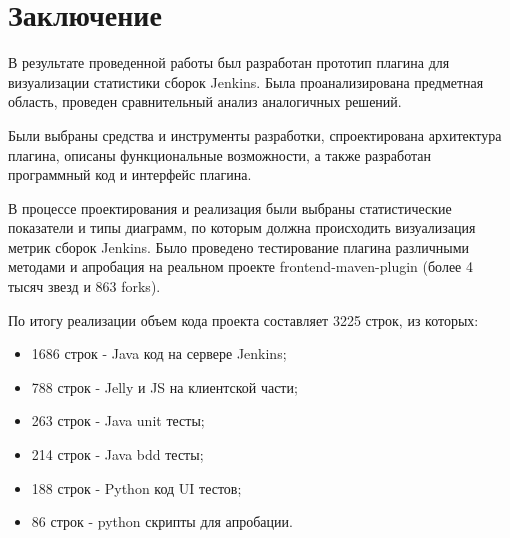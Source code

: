 \chapter*{Заключение} \label{ch-conclusion}

В результате проведенной работы был разработан прототип плагина для визуализации статистики сборок Jenkins. Была проанализирована предметная область, проведен сравнительный анализ аналогичных решений.

Были выбраны средства и инструменты разработки, спроектирована архитектура плагина, описаны функциональные возможности, а также разработан программный код и интерфейс плагина.

В процессе проектирования и реализация были выбраны статистические показатели и типы диаграмм, по которым должна происходить визуализация метрик сборок Jenkins. Было проведено тестирование плагина различными методами и апробация на реальном проекте frontend-maven-plugin (более 4 тысяч звезд и 863 forks).

По итогу реализации объем кода проекта составляет 3225 строк, из которых:

\begin{itemize}
	\item 1686 строк  - Java код на сервере Jenkins;
	\item 788 строк - Jelly и JS на клиентской части;
	\item 263 строк - Java unit тесты;
	\item 214 строк - Java bdd тесты;
	\item 188 строк - Python код UI тестов;
	\item 86 строк - python скрипты для апробации.
\end{itemize}
